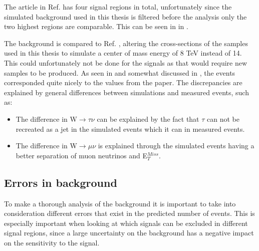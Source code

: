 The article in Ref. \citep{ATLAS-CONF-2012-147} has four signal regions in total, unfortunately since the simulated background used in this thesis is filtered before the analysis only the two highest regions are comparable. This can be seen in  in .

The background is compared to Ref. \citep{ATLAS-CONF-2012-147}, altering the cross-sections of the samples used in this thesis to simulate a center of mass energy of 8 TeV instead of 14. This could unfortunately not be done for the signals as that would require new samples to be produced. As seen in  and somewhat discussed in , the events corresponded quite nicely to the values from the paper. The discrepancies are explained by general differences between simulations and measured events, such as:
\begin{itemize}
\item The difference in W$\rightarrow\tau\nu$ can be explained by the fact that $\tau$ can not be recreated as a jet in the simulated events which it can in measured events.

\item The difference in W$\rightarrow\mu\nu$ is explained through the simulated events having a better separation of muon neutrinos and E$_T^{Miss}$.
\end{itemize}

\subsection{Errors in background}\label{subsec:errdata}
To make a thorough analysis of the background it is important to take into consideration different errors that exist in the predicted number of events. This is especially important when looking at which signals can be excluded in different signal regions, since a large uncertainty on the background has a negative impact on the sensitivity to the signal.



